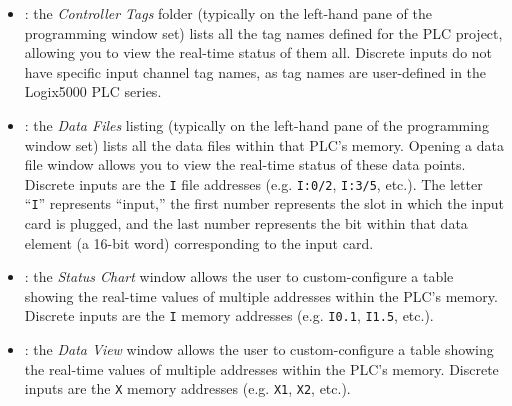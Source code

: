\begin{itemize}
\item{} : the {\it Controller Tags} folder (typically on the left-hand pane of the programming window set) lists all the tag names defined for the PLC project, allowing you to view the real-time status of them all.  Discrete inputs do not have specific input channel tag names, as tag names are user-defined in the Logix5000 PLC series.
\vskip 5pt
\item{} : the {\it Data Files} listing (typically on the left-hand pane of the programming window set) lists all the data files within that PLC's memory.  Opening a data file window allows you to view the real-time status of these data points.  Discrete inputs are the {\tt I} file addresses (e.g. {\tt I:0/2}, {\tt I:3/5}, etc.).  The letter ``{\tt I}'' represents ``input,'' the first number represents the slot in which the input card is plugged, and the last number represents the bit within that data element (a 16-bit word) corresponding to the input card.
\vskip 5pt
\item{} : the {\it Status Chart} window allows the user to custom-configure a table showing the real-time values of multiple addresses within the PLC's memory.  Discrete inputs are the {\tt I} memory addresses (e.g. {\tt I0.1}, {\tt I1.5}, etc.).
\vskip 5pt
\item{} : the {\it Data View} window allows the user to custom-configure a table showing the real-time values of multiple addresses within the PLC's memory.  Discrete inputs are the {\tt X} memory addresses (e.g. {\tt X1}, {\tt X2}, etc.).
\end{itemize}

\eject
















